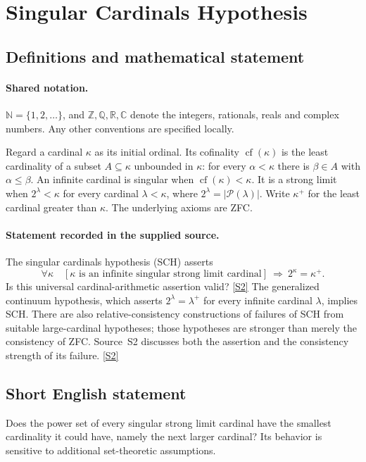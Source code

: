 \documentclass[11pt]{article}
\newcommand{\sref}[2]{\hyperlink{source:#1:#2}{[S#2]}}
\begin{document}
\section{Singular Cardinals Hypothesis}\label{statement}

\subsection{Definitions and mathematical statement}

\paragraph{Shared notation.}$\mathbb N=\{1,2,\ldots\}$, and $\mathbb Z,\mathbb Q,\mathbb R,\mathbb C$ denote the integers, rationals, reals and complex numbers. Any other conventions are specified locally.


Regard a cardinal $\kappa$ as its initial ordinal. Its cofinality $\operatorname{cf}(\kappa)$ is the least cardinality of a subset $A\subseteq\kappa$ unbounded in $\kappa$: for every $\alpha<\kappa$ there is $\beta\in A$ with $\alpha\le\beta$. An infinite cardinal is singular when $\operatorname{cf}(\kappa)<\kappa$. It is a strong limit when $2^\lambda<\kappa$ for every cardinal $\lambda<\kappa$, where $2^\lambda=|\mathcal P(\lambda)|$. Write $\kappa^+$ for the least cardinal greater than $\kappa$. The underlying axioms are ZFC.
\paragraph{Statement recorded in the supplied source.}
The singular cardinals hypothesis (SCH) asserts
\[
 \forall\kappa\quad
 [\kappa\text{ is an infinite singular strong limit cardinal}]
 \ \Longrightarrow\ 2^\kappa=\kappa^+.
\]
Is this universal cardinal-arithmetic assertion valid? \sref{statement}{2}
The generalized continuum hypothesis, which asserts $2^\lambda=\lambda^+$ for every infinite cardinal $\lambda$, implies SCH. There are also relative-consistency constructions of failures of SCH from suitable large-cardinal hypotheses; those hypotheses are stronger than merely the consistency of ZFC. Source~S2 discusses both the assertion and the consistency strength of its failure. \sref{statement}{2}
\subsection{Short English statement}
Does the power set of every singular strong limit cardinal have the smallest cardinality it could have, namely the next larger cardinal? Its behavior is sensitive to additional set-theoretic assumptions.
\end{document}
